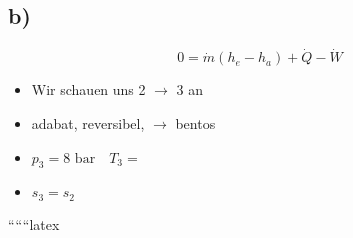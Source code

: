 

\subsection*{b)}

\[
0 = \dot{m} (h_e - h_a) + \dot{Q} - \dot{W}
\]

\begin{itemize}
    \item Wir schauen uns 2 $\rightarrow$ 3 an
    \item adabat, reversibel, $\rightarrow$ bentos
    \item $p_3 = 8 \text{ bar} \quad T_3 =$
    \item $s_3 = s_2$
\end{itemize}

``````latex